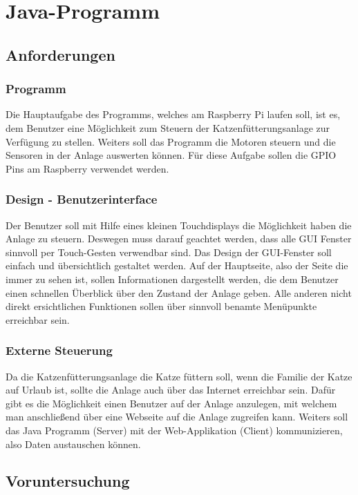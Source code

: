 
\chapter{Java-Programm}
\label{sec:java-programm}

\section{Anforderungen}
\subsection{Programm}
Die Hauptaufgabe des Programms, welches am Raspberry Pi laufen soll, ist es, dem Benutzer eine Möglichkeit zum Steuern der Katzenfütterungsanlage zur Verfügung zu stellen. Weiters soll das Programm die Motoren steuern und die Sensoren in der Anlage auswerten können. Für diese Aufgabe sollen die \ac{GPIO} Pins am Raspberry verwendet werden.
\subsection{Design - Benutzerinterface}
Der Benutzer soll mit Hilfe eines kleinen Touchdisplays die Möglichkeit haben die Anlage zu steuern. Deswegen muss darauf geachtet werden, dass alle \ac{GUI} Fenster sinnvoll per Touch-Gesten verwendbar sind.
Das Design der \ac{GUI}-Fenster soll einfach und übersichtlich gestaltet werden. Auf der Hauptseite, also der Seite die immer zu sehen ist, sollen Informationen dargestellt werden, die dem Benutzer einen schnellen Überblick über den Zustand der Anlage geben. Alle anderen nicht direkt ersichtlichen Funktionen sollen über sinnvoll benamte Menüpunkte erreichbar sein.
\subsection{Externe Steuerung}
Da die Katzenfütterungsanlage die Katze füttern soll, wenn die Familie der Katze auf Urlaub ist, sollte die Anlage auch über das Internet erreichbar sein. Dafür gibt es die Möglichkeit einen Benutzer auf der Anlage anzulegen, mit welchem man anschließend über eine Webseite auf die Anlage zugreifen kann. Weiters soll das Java Programm (Server) mit der Web-Applikation (Client) kommunizieren, also Daten austauschen können.

\newpage

\section{Voruntersuchung}
